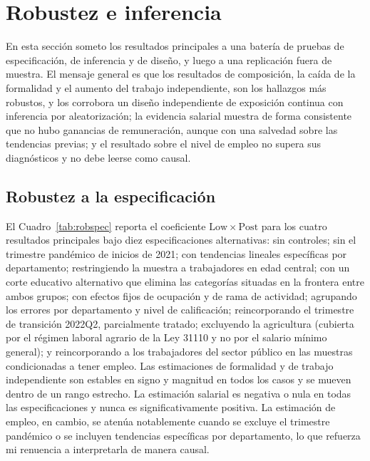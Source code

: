 \section{Robustez e inferencia}\label{sec:robustness}

En esta sección someto los resultados principales a una batería de pruebas de especificación, de inferencia y de diseño, y luego a una replicación fuera de muestra. El mensaje general es que los resultados de composición, la caída de la formalidad y el aumento del trabajo independiente, son los hallazgos más robustos, y los corrobora un diseño independiente de exposición continua con inferencia por aleatorización; la evidencia salarial muestra de forma consistente que no hubo ganancias de remuneración, aunque con una salvedad sobre las tendencias previas; y el resultado sobre el nivel de empleo no supera sus diagnósticos y no debe leerse como causal.

\subsection{Robustez a la especificación}

El Cuadro~\ref{tab:robspec} reporta el coeficiente $\mathrm{Low}\times\mathrm{Post}$ para los cuatro resultados principales bajo diez especificaciones alternativas: sin controles; sin el trimestre pandémico de inicios de 2021; con tendencias lineales específicas por departamento; restringiendo la muestra a trabajadores en edad central; con un corte educativo alternativo que elimina las categorías situadas en la frontera entre ambos grupos; con efectos fijos de ocupación y de rama de actividad; agrupando los errores por departamento y nivel de calificación; reincorporando el trimestre de transición 2022Q2, parcialmente tratado; excluyendo la agricultura (cubierta por el régimen laboral agrario de la Ley 31110 y no por el salario mínimo general); y reincorporando a los trabajadores del sector público en las muestras condicionadas a tener empleo. Las estimaciones de formalidad y de trabajo independiente son estables en signo y magnitud en todos los casos y se mueven dentro de un rango estrecho. La estimación salarial es negativa o nula en todas las especificaciones y nunca es significativamente positiva. La estimación de empleo, en cambio, se atenúa notablemente cuando se excluye el trimestre pandémico o se incluyen tendencias específicas por departamento, lo que refuerza mi renuencia a interpretarla de manera causal.



